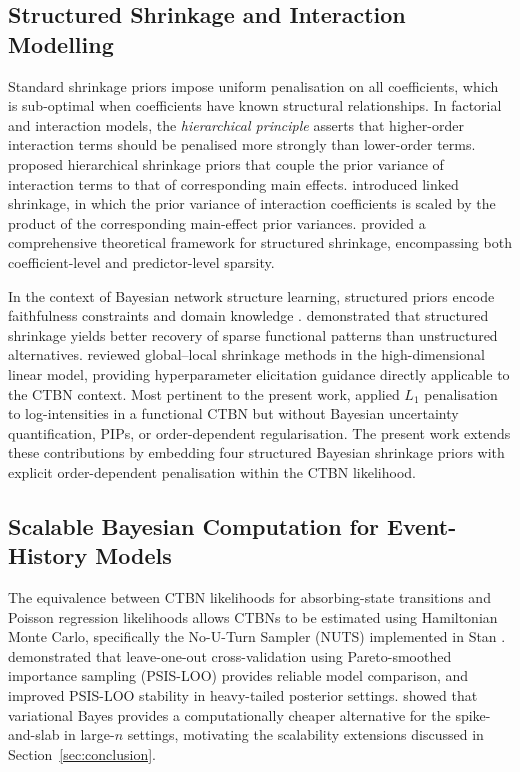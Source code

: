 \documentclass[12pt]{article}
\begin{document}
\subsection{Structured Shrinkage and Interaction Modelling}

Standard shrinkage priors impose uniform penalisation on all coefficients,
which is sub-optimal when coefficients have known structural relationships.
In factorial and interaction models, the \emph{hierarchical principle}
\citep{HamadaWu1992} asserts that higher-order interaction terms should be
penalised more strongly than lower-order terms.  \citet{griffin2017hierarchical}
proposed hierarchical shrinkage priors that couple the prior variance of
interaction terms to that of corresponding main effects.  \citet{van2024linked}
introduced linked shrinkage, in which the prior variance of interaction
coefficients is scaled by the product of the corresponding main-effect prior
variances.  \citet{griffin2024structured} provided a comprehensive theoretical
framework for structured shrinkage, encompassing both coefficient-level and
predictor-level sparsity.

In the context of Bayesian network structure learning, structured priors encode
faithfulness constraints and domain knowledge \citep{GeorgeMcCulloch1993,
BarbieriBerger2004}.  \citet{kowal2020bayesian} demonstrated that structured
shrinkage yields better recovery of sparse functional patterns than unstructured
alternatives.  \citet{griffin2021bayesian} reviewed global--local shrinkage
methods in the high-dimensional linear model, providing hyperparameter
elicitation guidance directly applicable to the CTBN context.  Most pertinent
to the present work, \citet{faruqui2021functional} applied $L_1$ penalisation
to log-intensities in a functional CTBN but without Bayesian uncertainty
quantification, PIPs, or order-dependent regularisation.  The present work
extends these contributions by embedding four structured Bayesian shrinkage
priors with explicit order-dependent penalisation within the CTBN likelihood.

\subsection{Scalable Bayesian Computation for Event-History Models}

The equivalence between CTBN likelihoods for absorbing-state transitions and
Poisson regression likelihoods \citep{faruqui2021functional} allows CTBNs to
be estimated using Hamiltonian Monte Carlo, specifically the No-U-Turn Sampler
(NUTS) implemented in Stan \citep{betancourt2017conceptual}.
\citet{VehtariGelmanGabry2017} demonstrated that leave-one-out cross-validation
using Pareto-smoothed importance sampling (PSIS-LOO) provides reliable model
comparison, and \citet{VehtariSimpson2024} improved PSIS-LOO stability in
heavy-tailed posterior settings.  \citet{ray2022variational} showed that
variational Bayes provides a computationally cheaper alternative for the
spike-and-slab in large-$n$ settings, motivating the scalability extensions
discussed in Section~\ref{sec:conclusion}.
\end{document}

